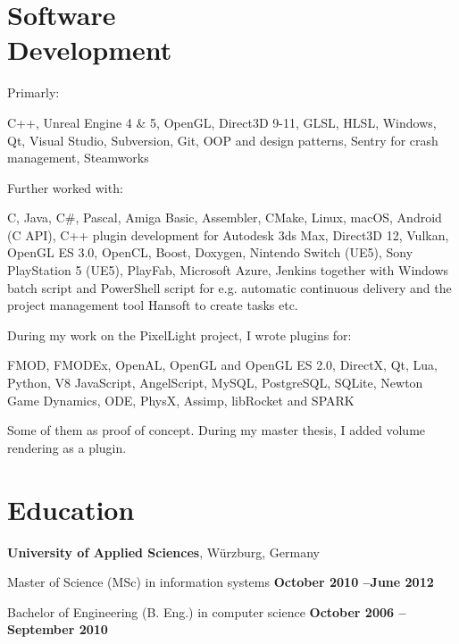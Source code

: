 \documentclass[margin,line]{Ofenberg_Resume}
\begin{document}
\begin{resume}
	\section{\mysidestyle Software\\Development}

	Primarly:
	\begin{list2}
		\item C++, Unreal Engine 4 \& 5, OpenGL, Direct3D 9-11, GLSL, HLSL, Windows, Qt, Visual Studio, Subversion, Git, OOP and design patterns, Sentry for crash management, Steamworks
	\end{list2}\vspace{-1.5mm}

	Further worked with:
	\begin{list2}
		\item C, Java, C\#, Pascal, Amiga Basic, Assembler, CMake, Linux, macOS, Android (C API), C++ plugin development for Autodesk 3ds Max, Direct3D 12, Vulkan, OpenGL ES 3.0, OpenCL, Boost, Doxygen, Nintendo Switch (UE5), Sony PlayStation 5 (UE5), PlayFab, Microsoft Azure, Jenkins together with Windows batch script and PowerShell script for e.g. automatic continuous delivery and the project management tool Hansoft to create tasks etc.
	\end{list2}\vspace{-1.5mm}

	During my work on the PixelLight project, I wrote plugins for:
	\begin{list2}
		\item FMOD, FMODEx, OpenAL, OpenGL and OpenGL ES 2.0, DirectX,
		Qt, Lua, Python, V8 JavaScript, AngelScript, MySQL, PostgreSQL, SQLite, Newton Game Dynamics, ODE, PhysX, Assimp, libRocket and SPARK
	\end{list2}\vspace{-1.5mm}
	Some of them as proof of concept. During my master thesis, I added volume rendering as a plugin.


	\section{\mysidestyle Education}
	\textbf{University of Applied Sciences}, W\"urzburg, Germany
	\begin{list2}
		\item Master of Science (MSc) in information systems \hfill \textbf{October 2010 --June 2012}\vspace{-3mm}\\\vspace{-1mm}%
		\item Bachelor of Engineering (B. Eng.) in computer science \hfill \textbf{October 2006 -- September 2010}\vspace{-3mm}\\\vspace{-1mm}%
	\end{list2}\vspace{-1.5mm}



\end{resume}
\end{document}
